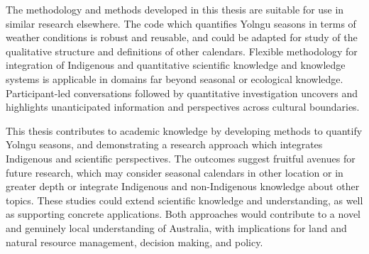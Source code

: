 The methodology and methods developed in this thesis are suitable for use in
similar research elsewhere.  The code which quantifies Yolngu seasons in terms of weather
conditions is robust and reusable, and could be adapted for study of the
qualitative structure and definitions of other calendars.
Flexible methodology for integration of Indigenous and quantitative
scientific knowledge and knowledge systems is applicable in domains far beyond
seasonal or ecological knowledge.  Participant-led conversations followed by
quantitative investigation uncovers and highlights unanticipated information
and perspectives across cultural boundaries.


This thesis contributes to academic knowledge by developing methods to
quantify Yolngu seasons, and demonstrating a research approach which
integrates Indigenous and scientific perspectives.
%
The outcomes suggest fruitful avenues for future research, which may consider seasonal calendars in
other location or in greater depth or integrate Indigenous and non-Indigenous
knowledge about other topics.  These studies could extend scientific knowledge
and understanding, as well as supporting concrete applications.  Both
approaches would contribute to a novel and genuinely local understanding of
Australia, with implications for land and natural resource management,
decision making, and policy.

